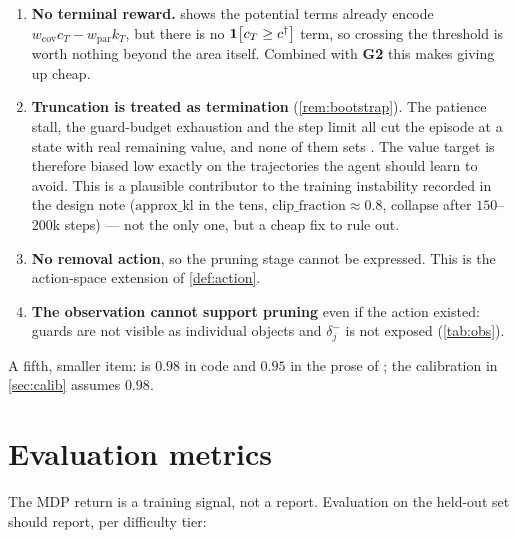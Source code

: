 \documentclass[11pt,a4paper]{article}
\begin{document}
\begin{enumerate}[label=\textbf{G\arabic*.},leftmargin=2.6em]
  \item \textbf{No terminal reward.}  shows the potential terms already
        encode $w_{\mathrm{cov}}c_T - w_{\mathrm{par}}k_T$, but there is no
        $\mathbf{1}\!\left[c_T \ge c^{\dagger}\right]$ term, so crossing the threshold is worth nothing beyond
        the area itself. Combined with \textbf{G2} this makes giving up cheap.
  \item \textbf{Truncation is treated as termination} (\cref{rem:bootstrap}). The patience
        stall, the guard-budget exhaustion and the step limit all cut the episode at a
        state with real remaining value, and none of them sets
        . The value target is therefore biased low exactly on the
        trajectories the agent should learn to avoid. This is a plausible contributor to the
        training instability recorded in the design note ($\text{approx\_kl}$ in the tens,
        $\text{clip\_fraction}\approx 0.8$, collapse after $150$--$200$k steps) --- not the
        only one, but a cheap fix to rule out.
  \item \textbf{No removal action}, so the pruning stage cannot be expressed. This is the
        action-space extension of \cref{def:action}.
  \item \textbf{The observation cannot support pruning} even if the action existed: guards
        are not visible as individual objects and $\delta^{-}_j$ is not exposed
        (\cref{tab:obs}).
  \end{enumerate}

A fifth, smaller item:  is $0.98$ in code and $0.95$ in the prose
of ; the calibration in \cref{sec:calib} assumes $0.98$.

\section{Evaluation metrics}

The MDP return is a training signal, not a report. Evaluation on the held-out set should
report, per difficulty tier:
\end{document}
